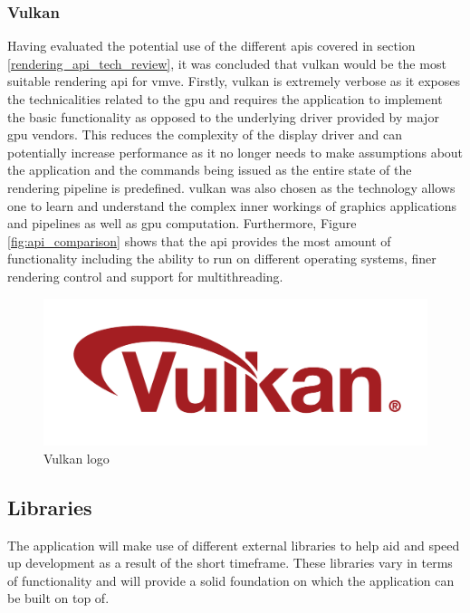 \documentclass[11pt]{article}
\begin{document}
\subsubsection{Vulkan} \label{rendering_api}
Having evaluated the potential use of the different \glspl*{api} covered in
section \ref{rendering_api_tech_review}, it was concluded that \gls*{vulkan}
would be the most suitable rendering \gls*{api} for \gls*{vmve}. Firstly,
\gls*{vulkan} is extremely verbose as it exposes the technicalities related to
the \gls*{gpu} and requires the application to implement the basic functionality
as opposed to the underlying driver provided by major \gls*{gpu} vendors. This
reduces the complexity of the display driver and can potentially increase
performance as it no longer needs to make assumptions about the application and
the commands being issued as the entire state of the rendering pipeline is
predefined. \gls*{vulkan} was also chosen as the technology allows one to learn
and understand the complex inner workings of graphics applications and pipelines
as well as \gls*{gpu} computation. Furthermore, Figure \ref{fig:api_comparison}
shows that the \gls*{api} provides the most amount of functionality including
the ability to run on different operating systems, finer rendering control and
support for multithreading.

\begin{figure}[H]
  \centering
  \includegraphics[width=\textwidth]{images/vulkan_logo.png}
  \caption{Vulkan logo \cite{vulkan}}
  \label{fig:vulkan_logo}
\end{figure}


\subsection{Libraries}
The application will make use of different external libraries to help aid and
speed up development as a result of the short timeframe. These libraries vary in
terms of functionality and will provide a solid foundation on which the
application can be built on top of.
\end{document}
